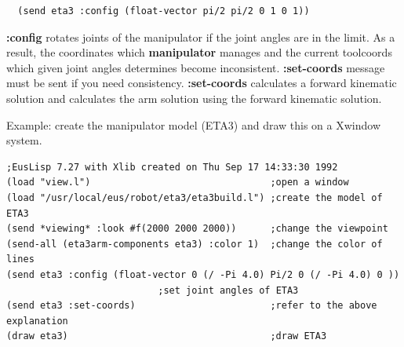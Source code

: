 
\begin{verbatim}
  (send eta3 :config (float-vector pi/2 pi/2 0 1 0 1))
\end{verbatim}

{\bf :config} rotates joints of the manipulator if the joint angles are in the 
limit. As a result, the coordinates which {\bf manipulator} manages and the 
current toolcoords which given joint angles determines become inconsistent.
{\bf :set-coords} message must be sent if you need consistency. {\bf :set-coords}
calculates a forward kinematic solution and calculates the arm solution using the 
forward kinematic solution.



Example: create the manipulator model (ETA3) and draw this on a Xwindow system.
\begin{verbatim}
;EusLisp 7.27 with Xlib created on Thu Sep 17 14:33:30 1992
(load "view.l")                                ;open a window
(load "/usr/local/eus/robot/eta3/eta3build.l") ;create the model of ETA3
(send *viewing* :look #f(2000 2000 2000))      ;change the viewpoint
(send-all (eta3arm-components eta3) :color 1)  ;change the color of lines
(send eta3 :config (float-vector 0 (/ -Pi 4.0) Pi/2 0 (/ -Pi 4.0) 0 ))
					       ;set joint angles of ETA3
(send eta3 :set-coords)                        ;refer to the above explanation
(draw eta3)                                    ;draw ETA3
\end{verbatim}



\clearpage

